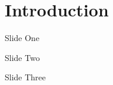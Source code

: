 \section{Introduction}

\begin{frame}{Slide One}

\end{frame}

\begin{frame}{Slide Two}

\end{frame}

\begin{frame}{Slide Three}

\end{frame}
